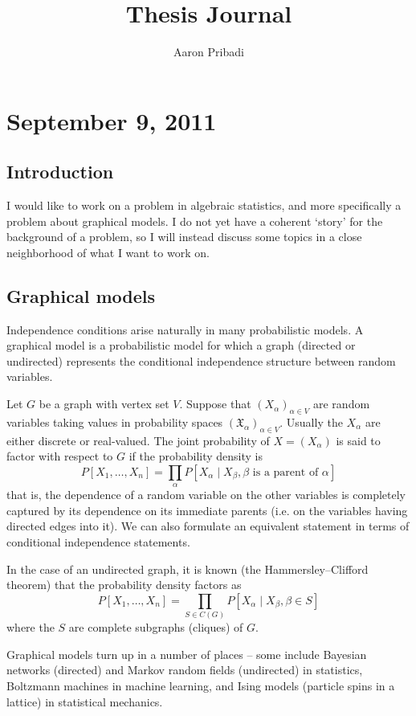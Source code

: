 \documentclass[12pt]{article}
\title{Thesis Journal}
\author{Aaron Pribadi}
\date{}
\newcommand*{\X}{\mathfrak{X}}
\begin{document}
\maketitle

\section{September 9, 2011}

\subsection{Introduction}

I would like to work on a problem in algebraic statistics, and more specifically
a problem about graphical models.  I do not yet have a coherent `story' for the
background of a problem, so I will instead discuss some topics in a close
neighborhood of what I want to work on.


\subsection{Graphical models}

Independence conditions arise naturally in many probabilistic models.  A
graphical model is a probabilistic model for which a graph (directed or
undirected) represents the conditional independence structure between random
variables. 

Let $G$ be a graph with vertex set $V$.  Suppose that $(X_\alpha)_{\alpha \in
V}$ are random variables taking values in probability spaces
$(\X_\alpha)_{\alpha \in V}$.  Usually the $X_\alpha$ are either discrete or
real-valued.  The joint probability of $X = (X_\alpha)$ is said to
factor with respect to $G$ if the probability density is
\[
    P[X_1, \ldots, X_n] = 
        \prod_\alpha P[X_\alpha \mid X_\beta, \beta \text{ is a parent of }
        \alpha]
\]
that is, the dependence of a random variable on the other variables is
completely captured by its dependence on its immediate parents (i.e. on the
variables having directed edges into it).  We can also formulate an equivalent
statement in terms of conditional independence statements.

In the case of an undirected graph, it is known (the Hammersley–Clifford
theorem) that the probability density factors as
\[
    P[X_1, \ldots, X_n] = 
        \prod_{S \in C(G)} P[X_\alpha \mid X_\beta, \beta \in S]
\]
where the $S$ are complete subgraphs (cliques) of $G$.

Graphical models turn up in a number of places -- some include Bayesian networks
(directed) and Markov random fields (undirected) in statistics, Boltzmann
machines in machine learning, and Ising models (particle spins in a lattice) in
statistical mechanics.
\end{document}
